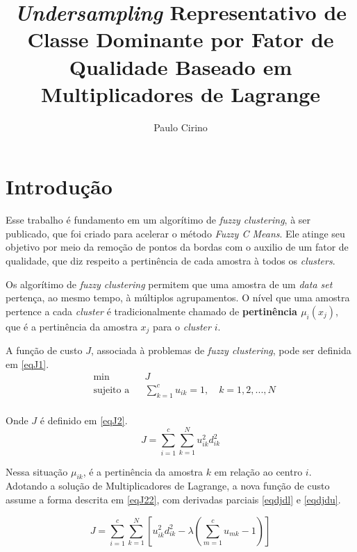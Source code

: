 \documentclass[]{article}
\title{\textit{Undersampling} Representativo de Classe Dominante por Fator de Qualidade Baseado em Multiplicadores de Lagrange  }
\author{Paulo Cirino}
\begin{document}
\maketitle

\begin{abstract}
	
\end{abstract}

\section{Introdução}

Esse trabalho é fundamento em um algorítimo de \textit{fuzzy clustering}, à ser publicado, que foi criado para acelerar o método \textit{Fuzzy C Means}. Ele atinge seu objetivo por meio da remoção de pontos da bordas com o auxilio de um fator de qualidade, que diz respeito a pertinência de cada amostra à todos os \textit{clusters}.

Os algorítimo de  \textit{fuzzy clustering } permitem que uma amostra de um \textit{data set} pertença, ao mesmo tempo, à múltiplos agrupamentos. O nível que uma amostra pertence a cada \textit{cluster} é tradicionalmente chamado de \textbf{pertinência $\mu_{i}(x_j)$}, que é a pertinência da amostra $x_j$ para o \textit{cluster} $i$.

A função de custo $J$, associada à problemas de \textit{fuzzy clustering}, pode ser definida em 
\ref{eqJ1}.
\begin{equation}
\label{eqJ1}
\begin{aligned}
& {\text{min}}
& & J \\
& \text{sujeito a}
& & \sum_{k=1}^c u_{ik}=1,   \quad k=1,2,...,N \\
\end{aligned}
\end{equation}

Onde $J$ é definido em \ref{eqJ2}.
\begin{equation}
\label{eqJ2}
J = \sum_{i=1}^c \sum_{k=1}^N u_{ik}^2 d_{ik}^2
\end{equation} 


Nessa situação $\mu_{ik}$, é a pertinência da amostra $k$ em relação ao centro $i$. Adotando a solução de Multiplicadores de Lagrange, a nova função de custo assume a forma descrita em \ref{eqJ22}, com derivadas parciais \ref{eqdjdl} e \ref{eqdjdu}. 

\begin{equation}
\label{eqJ22}
J = \sum_{i=1}^c \sum_{k=1}^N \left [  u_{ik}^2 d_{ik}^2 - \lambda (\sum_{m=1}^c u_{mk}-1)\right]
\end{equation}
\end{document}
